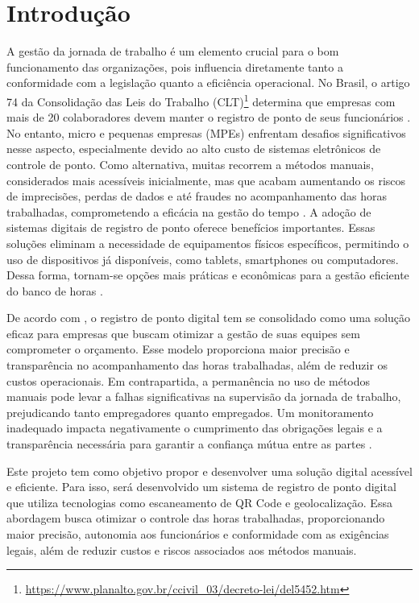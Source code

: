\chapter{Introdução}

A gestão da jornada de trabalho é um elemento crucial para o bom funcionamento das organizações, pois influencia diretamente tanto a conformidade com a legislação quanto a eficiência operacional. No Brasil, o artigo 74 da Consolidação das Leis do Trabalho (CLT)\footnote{\url{https://www.planalto.gov.br/ccivil_03/decreto-lei/del5452.htm}} determina que empresas com mais de 20 colaboradores devem manter o registro de ponto de seus funcionários \cite{brasil1943}. No entanto, micro e pequenas empresas (MPEs) enfrentam desafios significativos nesse aspecto, especialmente devido ao alto custo de sistemas eletrônicos de controle de ponto. Como alternativa, muitas recorrem a métodos manuais, considerados mais acessíveis inicialmente, mas que acabam aumentando os riscos de imprecisões, perdas de dados e até fraudes no acompanhamento das horas trabalhadas, comprometendo a eficácia na gestão do tempo \cite{miranda2023}.
A adoção de sistemas digitais de registro de ponto oferece benefícios importantes. Essas soluções eliminam a necessidade de equipamentos físicos específicos, permitindo o uso de dispositivos já disponíveis, como tablets, smartphones ou computadores. Dessa forma, tornam-se opções mais práticas e econômicas para a gestão eficiente do banco de horas \cite{FlorindoBianchi2022}.
 
De acordo com \textcite{gomes2023}, o registro de ponto digital tem se consolidado como uma solução eficaz para empresas que buscam otimizar a gestão de suas equipes sem comprometer o orçamento. Esse modelo proporciona maior precisão e transparência no acompanhamento das horas trabalhadas, além de reduzir os custos operacionais. Em contrapartida, a permanência no uso de métodos manuais pode levar a falhas significativas na supervisão da jornada de trabalho, prejudicando tanto empregadores quanto empregados. Um monitoramento inadequado impacta negativamente o cumprimento das obrigações legais e a transparência necessária para garantir a confiança mútua entre as partes \cite{abreu2016sistema}.

Este projeto tem como objetivo propor e desenvolver uma solução digital acessível e eficiente. Para isso, será desenvolvido um sistema de registro de ponto digital que utiliza tecnologias como escaneamento de QR Code e geolocalização. Essa abordagem busca otimizar o controle das horas trabalhadas, proporcionando maior precisão, autonomia aos funcionários e conformidade com as exigências legais, além de reduzir custos e riscos associados aos métodos manuais. 

